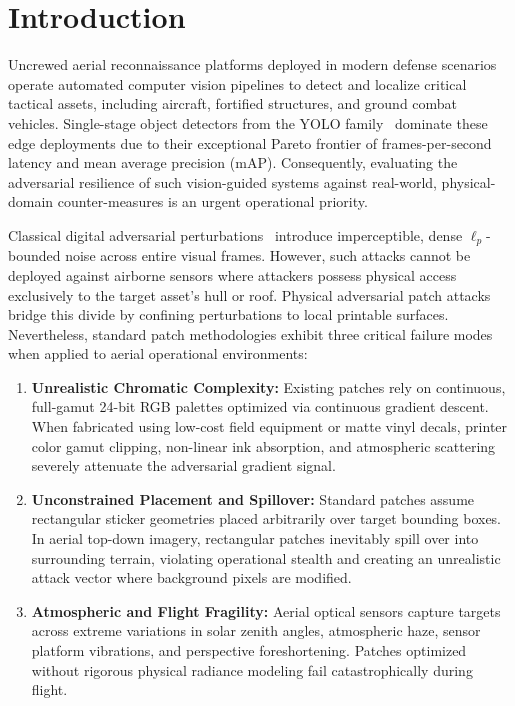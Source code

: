 \documentclass[conference]{IEEEtran}
\begin{document}
\section{Introduction}
Uncrewed aerial reconnaissance platforms deployed in modern defense scenarios operate automated computer vision pipelines to detect and localize critical tactical assets, including aircraft, fortified structures, and ground combat vehicles. Single-stage object detectors from the YOLO family~\cite{redmon2016you,jocher2024yolo11} dominate these edge deployments due to their exceptional Pareto frontier of frames-per-second latency and mean average precision (mAP). Consequently, evaluating the adversarial resilience of such vision-guided systems against real-world, physical-domain counter-measures is an urgent operational priority.

Classical digital adversarial perturbations~\cite{goodfellow2014explaining,madry2018towards} introduce imperceptible, dense $\ell_p$-bounded noise across entire visual frames. However, such attacks cannot be deployed against airborne sensors where attackers possess physical access exclusively to the target asset's hull or roof. Physical adversarial patch attacks~\cite{brown2017adversarial,thys2019fooling} bridge this divide by confining perturbations to local printable surfaces. Nevertheless, standard patch methodologies exhibit three critical failure modes when applied to aerial operational environments:
\begin{enumerate}
    \item \textbf{Unrealistic Chromatic Complexity:} Existing patches rely on continuous, full-gamut 24-bit RGB palettes optimized via continuous gradient descent. When fabricated using low-cost field equipment or matte vinyl decals, printer color gamut clipping, non-linear ink absorption, and atmospheric scattering severely attenuate the adversarial gradient signal.
    \item \textbf{Unconstrained Placement and Spillover:} Standard patches assume rectangular sticker geometries placed arbitrarily over target bounding boxes. In aerial top-down imagery, rectangular patches inevitably spill over into surrounding terrain, violating operational stealth and creating an unrealistic attack vector where background pixels are modified.
    \item \textbf{Atmospheric and Flight Fragility:} Aerial optical sensors capture targets across extreme variations in solar zenith angles, atmospheric haze, sensor platform vibrations, and perspective foreshortening. Patches optimized without rigorous physical radiance modeling fail catastrophically during flight.
\end{enumerate}
\end{document}
